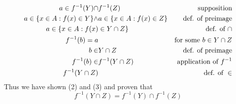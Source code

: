 \documentclass{article}
\begin{document}
\begin{exercise}{}{}
	\begin{align}
		a\in f^{-1}(Y) \cap                  & f^{-1}(Z)                      & \text{supposition}                        \\
		a\in \{x \in A: f(x) \in Y\} \land & a\in \{x \in A: f(x) \in Z\} & \text{def.                   of preimage} \\
		a\in \{x \in A: f(x)              & \in Y\cap Z\}                   & \text{def.                   of }\cap     \\
		f^{-1}(b) = a                        &                                & \text{for some }b\in Y\cap Z              \\
		b \in                                & Y \cap Z                       & \text{def.                   of preimage} \\
		f^{-1}(b) \in                        & f^{-1}(Y\cap Z)                & \text{application of }f^{-1}              \\
		f^{-1}(Y\cap Z)                      &                                & \text{def.                   of }\in
	\end{align}
	Thus we have shown (2) and (3) and proven that
	\[
		f^{-1}(Y \cap Z)=f^{-1}(Y) \cap f^{-1}(Z)
	\]
\end{exercise}{}{}
\end{document}
